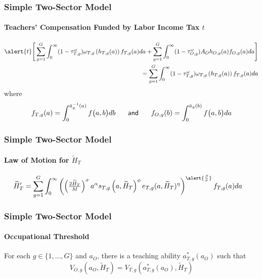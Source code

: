 \documentclass[11pt,hyperref={bookmarks=false},table,aspectratio=169]{beamer}
\begin{document}
	\begin{frame}
		\frametitle{Simple Two-Sector Model}
		\framesubtitle{Teachers' Compensation Funded by Labor Income Tax $t$}
		\begin{align*}
			\alert{t}\Bigg[ \sum_{g=1}^G \int_0^\infty (1-\tau^{\omega}_{T,g})\omega_{T,g}\left(h_{T,g}(a)\right) f_{T,g}(a) da  + \sum_{g=1}^G \int_0^\infty (1-\tau^{\omega}_{O,g})A_O h_{O,g}(a) f_{O,g}(a) da \Bigg]\\
			= \sum_{g=1}^G \int_0^\infty (1-\tau^{\omega}_{T,g})\omega_{T,g}\left(h_{T,g}(a)\right) f_{T,g}(a) da \\
		\end{align*}
where
\begin{displaymath}
f_{T,g}(a)  = \int_0^{\bar{a}_g^{-1}\left(a\right)} f\big(a,b \big) db \hspace{5mm} \textrm{ \sf and } \hspace{5mm} f_{O,g}(b)  = \int_0^{\bar{a}_g\left(b\right)} f\big(a,b \big) da
\end{displaymath}


	\end{frame}

 \begin{frame}
		\frametitle{Simple Two-Sector Model}
		\framesubtitle{Law of Motion for $\tilde{H}_T$}
		\begin{align*}
			\widetilde{H}_{T}' & = \sum_{g=1}^G \int_0^\infty \left(\left(\tfrac{2 \widetilde{H}_T}{M}\right)^\sigma a^\alpha s_{T,g}\left(a,\widetilde{H}_T\right)^\phi e_{T,g}(a,\widetilde{H}_T)^\eta \right)^{\alert{\frac{\beta}{\sigma}}} f_{T,g}(a) da 
		\end{align*}
	\end{frame}
	
	\begin{frame}
		\frametitle{Simple Two-Sector Model}
		\framesubtitle{Occupational Threshold}
		For each $g \in \{1,\ldots,G \}$ and $a_O$, there is a teaching ability $a^*_{T,g}(a_O)$ such that
		\begin{equation*}
			\label{eq:indiff}
			V_{O,g}(a_{O},\widetilde{H}_T) = V_{T,g}\left(a^*_{T,g}(a_O),\widetilde{H}_T\right)%
		\end{equation*}
	\end{frame}
	
\end{document}
